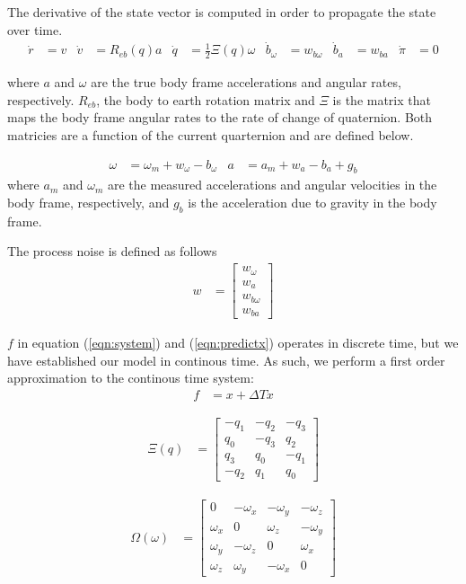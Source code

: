 \documentclass[]{article}
\begin{document}
{The derivative of the state vector is computed in order to propagate the state over time.
\begin{align}
	\dot{r} &= v
	&
	\dot{v} &= R_{eb}(q) a
	&
	\dot{q} &= \frac{1}{2}\Xi(q) \omega
	&
	\dot{b}_\omega &= w_{b\omega}
	&
	\dot{b}_a &= w_{ba}
	&
	\dot{\pi} &= 0
\end{align}

where $a$ and $\omega$ are the true body frame accelerations and angular rates, respectively.
$R_{eb}$, the body to earth rotation matrix and $\Xi$ is the matrix that maps the body frame angular rates to the rate of change of quaternion. Both matricies are a function of the current quarternion and are defined below.

\begin{align}
	\omega &= \omega_m + w_\omega - b_\omega &
	a &= a_m + w_a - b_a + g_b
\end{align}
where $a_m$ and $\omega_m$ are the measured accelerations and angular velocities in the body frame, respectively, and $g_b$ is the acceleration due to gravity in the body frame.

The process noise is defined as follows
\begin{align}
	w &= 
	\left[
	\begin{matrix}
		w_\omega \\
		w_a \\
		w_{b\omega} \\
		w_{ba}
	\end{matrix}
	\right]
\end{align}

$f$ in equation (\ref{eqn:system}) and (\ref{eqn:predictx}) operates in discrete time, but we have established our model in continous time. As such, we perform a first order approximation to the continous time system:
\begin{align}
	f &= x + \Delta T \dot{x}
	\label{eqn:descrete_f}
\end{align}

\begin{align}
	\Xi(q) &=
	\left[
	\begin{matrix}
		-q_1 	& -q_2	& -q_3 	\\
		q_0		& -q_3 	& q_2 	\\
		q_3 	& q_0 	& -q_1 	\\
		-q_2 	& q_1 	& q_0
	\end{matrix}
	\right]
\end{align}

\begin{align}
	\Omega(\omega) &=
	\left[
	\begin{matrix}
		0 			& -\omega_x 	& -\omega_y	& -\omega_z	\\
		\omega_x 	& 0 			& \omega_z 	& -\omega_y \\
		\omega_y 	& -\omega_z 	& 0 		& \omega_x 	\\
		\omega_z 	& \omega_y		& -\omega_x & 0
	\end{matrix}
	\right]
\end{align}

}
\end{document}
